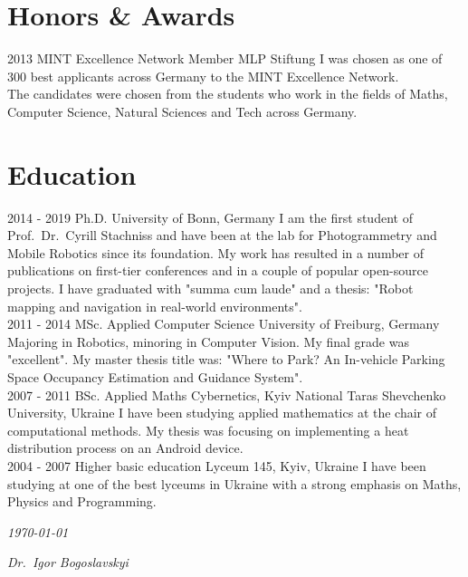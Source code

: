 \documentclass[]{friggeri-cv}
\begin{document}
{\section{Honors \& Awards}
\begin{entrylist}
  \entrywide
    {2013}
    {MINT Excellence Network Member}
    {MLP Stiftung}
    {I was chosen as one of 300 best applicants across Germany to the MINT Excellence Network.\\The candidates were chosen from the students who work in the fields of Maths, Computer Science, Natural Sciences and Tech across Germany.}
\end{entrylist}

\section{Education}
\begin{entrylist}
  \entrywide
    {2014 - 2019}
    {Ph.D.}
    {University of Bonn, Germany}
    {I am the first student of Prof.~Dr.~Cyrill Stachniss and have been at the lab for Photogrammetry and Mobile Robotics since its foundation. My work has resulted in a number of publications on first-tier conferences and in a couple of popular open-source projects. I have graduated with "summa cum laude" and a thesis: "Robot mapping and navigation in real-world environments".\\}
  \entrywide
    {2011 - 2014}
    {MSc. Applied Computer Science}
    {University of Freiburg, Germany}
    {Majoring in Robotics, minoring in Computer Vision. My final grade was "excellent". My master thesis title was: "Where to Park? An In-vehicle Parking Space Occupancy Estimation and Guidance System".\\}
  \entrywide
    {2007 - 2011}
    {BSc. Applied Maths}
    {Cybernetics,  Kyiv National Taras Shevchenko University, Ukraine}
    {I have been studying applied mathematics at the chair of computational methods. My thesis was focusing on implementing a heat distribution process on an Android device.\\}
  \entrywide
    {2004 - 2007}
    {Higher basic education}
    {Lyceum 145, Kyiv, Ukraine}
    {I have been studying at one of the best lyceums in Ukraine with a strong emphasis on Maths, Physics and Programming.\\}
\end{entrylist}

\begin{flushleft}
\emph{\today}
\end{flushleft}
\vspace{-8mm}
\begin{flushright}
\emph{Dr.~Igor Bogoslavskyi}
\end{flushright}

\clearpage
\restoregeometry
}
\end{document}

